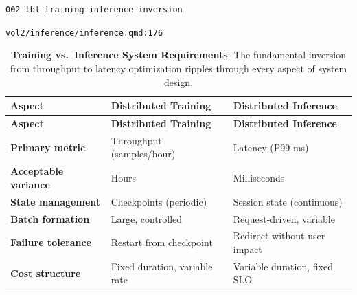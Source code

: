 \documentclass[
  twoside]{scrbook}
\makeatletter
\newif\ifmlsys@inside@longtable
\newif\ifmlsys@longtable@numbered
\let\mlsys@orig@label\label
\renewcommand{\label}[1]{%
  \ifmlsys@inside@longtable
    \global\mlsys@longtable@numberedtrue
  \fi
  \mlsys@orig@label{#1}%
}
\makeatother
\begin{document}
\clearpage

\texttt{002\ tbl-training-inference-inversion}

\texttt{vol2/inference/inference.qmd:176}

\begin{longtable}[]{@{}
  >{\raggedright\arraybackslash}p{}
  >{\centering\arraybackslash}p{}
  >{\centering\arraybackslash}p{}@{}}
\caption{\textbf{Training vs.~Inference System Requirements}: The
fundamental inversion from throughput to latency optimization ripples
through every aspect of system
design.}\label{tbl-training-inference-inversion}\tabularnewline
\toprule\noalign{}
\begin{minipage}[b]{\linewidth}\raggedright
\textbf{Aspect}
\end{minipage} & \begin{minipage}[b]{\linewidth}\centering
\textbf{Distributed Training}
\end{minipage} & \begin{minipage}[b]{\linewidth}\centering
\textbf{Distributed Inference}
\end{minipage} \\
\midrule\noalign{}
\endfirsthead
\toprule\noalign{}
\begin{minipage}[b]{\linewidth}\raggedright
\textbf{Aspect}
\end{minipage} & \begin{minipage}[b]{\linewidth}\centering
\textbf{Distributed Training}
\end{minipage} & \begin{minipage}[b]{\linewidth}\centering
\textbf{Distributed Inference}
\end{minipage} \\
\midrule\noalign{}
\endhead
\bottomrule\noalign{}
\endlastfoot
\textbf{Primary metric} & Throughput (samples/hour) & Latency (P99
ms) \\
\textbf{Acceptable variance} & Hours & Milliseconds \\
\textbf{State management} & Checkpoints (periodic) & Session state
(continuous) \\
\textbf{Batch formation} & Large, controlled & Request-driven,
variable \\
\textbf{Failure tolerance} & Restart from checkpoint & Redirect without
user impact \\
\textbf{Cost structure} & Fixed duration, variable rate & Variable
duration, fixed SLO \\
\end{longtable}
\end{document}
